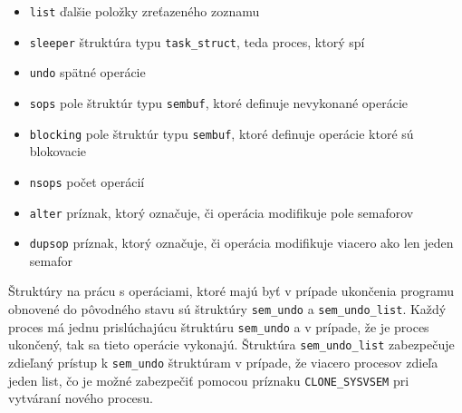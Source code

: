 \begin{itemize}
\item \texttt{list} ďalšie položky zreťazeného zoznamu
\item \texttt{sleeper} štruktúra typu \texttt{task\_struct}, teda proces, ktorý spí
\item \texttt{undo} spätné operácie
\item \texttt{sops} pole štruktúr typu \texttt{sembuf}, ktoré definuje nevykonané operácie
\item \texttt{blocking} pole štruktúr typu \texttt{sembuf}, ktoré definuje operácie ktoré sú blokovacie
\item \texttt{nsops} počet operácií
\item \texttt{alter} príznak, ktorý označuje, či operácia modifikuje pole semaforov
\item \texttt{dupsop} príznak, ktorý označuje, či operácia modifikuje viacero ako len jeden semafor
\end{itemize}
Štruktúry na prácu s operáciami, ktoré majú byť v prípade ukončenia programu obnovené do pôvodného stavu sú štruktúry \texttt{sem\_undo} a \texttt{sem\_undo\_list}. Každý proces má jednu prislúchajúcu štruktúru \texttt{sem\_undo} a v prípade, že je proces ukončený, tak sa tieto operácie vykonajú. Štruktúra \texttt{sem\_undo\_list} zabezpečuje zdieľaný prístup k \texttt{sem\_undo} štruktúram v prípade, že viacero procesov zdieľa jeden list, čo je možné zabezpečiť pomocou príznaku \texttt{CLONE\_SYSVSEM} pri vytváraní nového procesu.\cite{newlinux}
